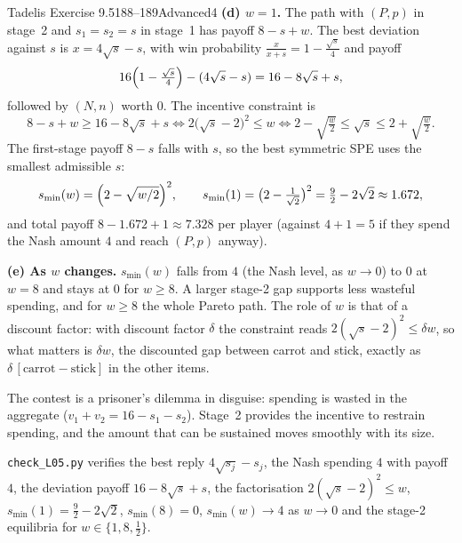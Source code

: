\begin{exsol}{Tadelis Exercise 9.5}{188--189}{Advanced}{4}
\textbf{(d) $w = 1$.} The path with $(P,p)$ in stage~2 and $s_1 = s_2 = s$ in stage~1 has payoff $8 - s + w$. The best deviation
against $s$ is $x = 4\sqrt s - s$, with win probability $\frac{x}{x + s} = 1 - \frac{\sqrt s}{4}$ and payoff
\[
  16\Bigl(1 - \tfrac{\sqrt s}{4}\Bigr) - (4\sqrt s - s) = 16 - 8\sqrt s + s ,
\]
followed by $(N,n)$ worth $0$. The incentive constraint is
\[
  8 - s + w \ge 16 - 8\sqrt s + s \iff 2\bigl(\sqrt s - 2\bigr)^2 \le w
  \iff 2 - \sqrt{\tfrac w2} \le \sqrt s \le 2 + \sqrt{\tfrac w2}.
\]
The first-stage payoff $8 - s$ falls with $s$, so the best symmetric SPE uses the smallest admissible $s$:
\[
  s_{\min}(w) = \Bigl(2 - \sqrt{w/2}\Bigr)^2 , \qquad s_{\min}(1) = \bigl(2 - \tfrac1{\sqrt2}\bigr)^2 = \tfrac92 - 2\sqrt2 \approx 1.672 ,
\]
and total payoff $8 - 1.672 + 1 \approx 7.328$ per player (against $4 + 1 = 5$ if they spend the Nash amount $4$ and reach $(P,p)$ anyway).

\textbf{(e) As $w$ changes.} $s_{\min}(w)$ falls from $4$ (the Nash level, as $w \to 0$) to $0$ at $w = 8$ and stays at $0$ for
$w \ge 8$. A larger stage-2 gap supports less wasteful spending, and for $w \ge 8$ the whole Pareto path. The role of
$w$ is that of a discount factor: with discount factor $\delta$ the constraint reads $2(\sqrt s - 2)^2 \le \delta w$, so what
matters is $\delta w$, the discounted gap between carrot and stick, exactly as $\delta\,[\text{carrot} - \text{stick}]$
in the other items.

\interp The contest is a prisoner's dilemma in disguise: spending is wasted in the aggregate ($v_1 + v_2 = 16 - s_1 - s_2$).
Stage~2 provides the incentive to restrain spending, and the amount that can be sustained moves smoothly with its size.

\verify \texttt{check\_L05.py} verifies the best reply $4\sqrt{s_j} - s_j$, the Nash spending $4$ with payoff $4$, the deviation
payoff $16 - 8\sqrt s + s$, the factorisation $2(\sqrt s - 2)^2 \le w$, $s_{\min}(1) = \frac92 - 2\sqrt2$, $s_{\min}(8) = 0$,
$s_{\min}(w) \to 4$ as $w \to 0$ and the stage-2 equilibria for $w \in \{1, 8, \frac12\}$.

\end{exsol}
